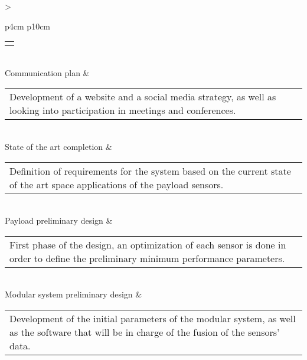 \begin{longtable}[H]{>{\raggedright\arraybackslash}p{4cm} p{10cm}}
\begin{tabular}[c]{@{}l@{}}
\begin{minipage}[t]{\linewidth}
	\end{minipage} \end{tabular}                                                                                                                                              \\  \midrule
	Communication plan & \begin{tabular}[c]{@{}l@{}}\begin{minipage}[t]{\linewidth}
			Development of a website and a social media strategy, as well as looking into participation in meetings and conferences. \vspace{0.3cm}
	\end{minipage} \end{tabular}                                                                                                                                               \\ \midrule
	State of the art completion & \begin{tabular}[c]{@{}l@{}}\begin{minipage}[t]{\linewidth}
			Definition of requirements for the system based on the current state of the art space applications of the payload sensors. \vspace{0.3cm}
	\end{minipage} \end{tabular}                                                                                                                                             \\  \midrule  
	Payload preliminary design & \begin{tabular}[c]{@{}l@{}}\begin{minipage}[t]{\linewidth}
			First phase of the design, an optimization of each sensor is done in order to define the preliminary minimum performance parameters. \vspace{0.3cm}
	\end{minipage} \end{tabular}                                                                                                                                             \\ \midrule
	Modular system preliminary design & \begin{tabular}[c]{@{}l@{}}\begin{minipage}[t]{\linewidth}
			Development of the initial parameters of the modular system, as well as the software that will be in charge of the fusion of the sensors’ data. \vspace{0.3cm}

\end{minipage}
\end{tabular}
\end{longtable}
